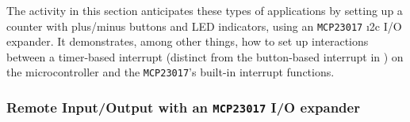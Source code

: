 The activity in this section anticipates these types of applications by setting up a counter with plus/minus buttons and LED indicators, using an \texttt{MCP23017} \i2c I/O expander.
It demonstrates, among other things, how to set up interactions between a timer-based interrupt (distinct from the button-based interrupt in ) on the microcontroller and the \texttt{MCP23017}'s built-in interrupt functions.

\subsubsection{\howto Remote Input/Output with an \texttt{MCP23017} I/O expander}
\begin{marginfigure}
	\begin{center}

\end{center}
\end{marginfigure}
